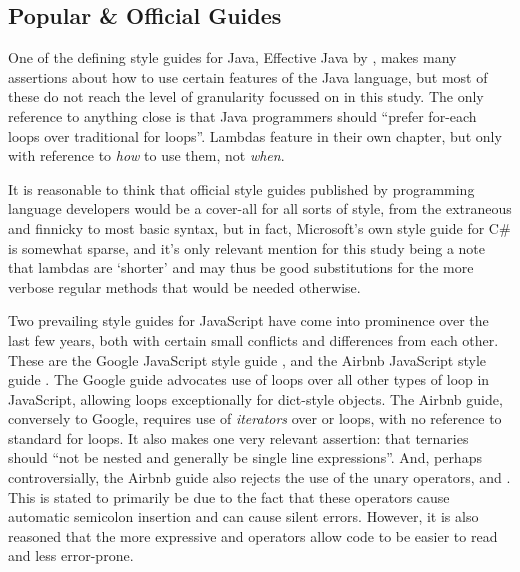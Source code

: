\documentclass{article}
\begin{document}
    \subsection{Popular \& Official Guides}
        One of the defining style guides for Java, Effective Java by \cite{effectiveJava}, makes many assertions about how to use certain features of the Java language, but most of these do not reach the level of granularity focussed on in this study. The only reference to anything close is that Java programmers should ``prefer for-each loops over traditional for loops''. Lambdas feature in their own chapter, but only with reference to \emph{how} to use them, not \emph{when}.

        It is reasonable to think that official style guides published by programming language developers would be a cover-all for all sorts of style, from the extraneous and finnicky to most basic syntax, but in fact, Microsoft's own style guide for C\# is somewhat sparse, and it's only relevant mention for this study being a note that lambdas are `shorter' and may thus be good substitutions for the more verbose regular methods that would be needed otherwise.

        Two prevailing style guides for JavaScript have come into prominence over the last few years, both with certain small conflicts and differences from each other. These are the Google JavaScript style guide \citep{googleJSStyle}, and the Airbnb JavaScript style guide \citep{airbnbJSStyle}. The Google guide advocates use of  loops over all other types of  loop in JavaScript, allowing  loops exceptionally for dict-style objects. The Airbnb guide, conversely to Google, requires use of \emph{iterators} over  or  loops, with no reference to standard for loops. It also makes one very relevant assertion: that ternaries should ``not be nested and generally be single line expressions''. And, perhaps controversially, the Airbnb guide also rejects the use of the unary operators, \codeword{++} and \codeword{--}. This is stated to primarily be due to the fact that these operators cause automatic semicolon insertion and can cause silent errors. However, it is also reasoned that the more expressive \codeword{+=} and \codeword{-=} operators allow code to be easier to read and less error-prone.
\end{document}
